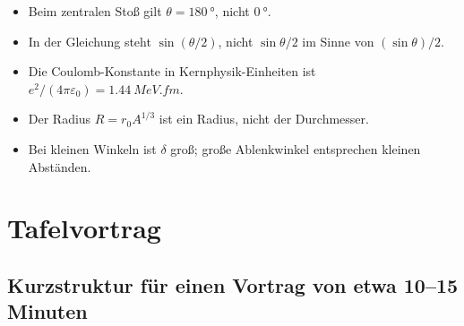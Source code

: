 \documentclass[11pt,a4paper]{scrartcl}
\begin{document}
\begin{calculationbox}[title=Skizze: kleinster Abstand als Funktion des Streuwinkels]
\begin{center}
\end{center}
\end{calculationbox}

\begin{warningbox}[title=Typische Fehler bei Aufgabe 2]
\begin{itemize}
    \item Beim zentralen Sto\ss{} gilt $\theta=\SI{180}{\degree}$, nicht $\SI{0}{\degree}$.
    \item In der Gleichung steht $\sin(\theta/2)$, nicht $\sin\theta/2$ im Sinne von $(\sin\theta)/2$.
    \item Die Coulomb-Konstante in Kernphysik-Einheiten ist $e^2/(4\pi\varepsilon_0)=\SI{1.44}{MeV.fm}$.
    \item Der Radius $R=r_0A^{1/3}$ ist ein Radius, nicht der Durchmesser.
    \item Bei kleinen Winkeln ist $\delta$ gro\ss{}; gro\ss{}e Ablenkwinkel entsprechen kleinen Abst\"anden.
\end{itemize}
\end{warningbox}

\FloatBarrier
\newpage

\section{Tafelvortrag}

\subsection{Kurzstruktur f\"ur einen Vortrag von etwa 10--15 Minuten}
\end{document}
